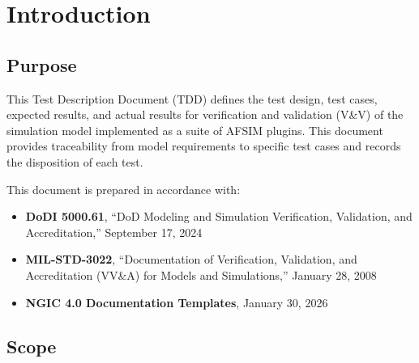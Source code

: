 \vfill
\pagebreak


\tableofcontents\thispagestyle{fancy}\pagebreak
\listoftables\thispagestyle{fancy}\pagebreak
\listoffigures\thispagestyle{fancy}\pagebreak



\section{\unclass Introduction}\label{sec:Introduction}

\subsection{\unclass Purpose}\label{sec:Purpose}

\unclass This Test Description Document (TDD) defines the test design, test cases, expected results, and actual results for verification and validation (V\&V) of the \modelname{} simulation model implemented as a suite of AFSIM plugins. This document provides traceability from model requirements to specific test cases and records the disposition of each test.

\unclass This document is prepared in accordance with:

\begin{itemize}
	\item \unclass \textbf{DoDI 5000.61}, ``DoD Modeling and Simulation Verification, Validation, and Accreditation,'' September 17, 2024~\cite{DoDI500061}
	\item \unclass \textbf{MIL-STD-3022}, ``Documentation of Verification, Validation, and Accreditation (VV\&A) for Models and Simulations,'' January 28, 2008~\cite{MILSTD3022}
	\item \unclass \textbf{NGIC 4.0 Documentation Templates}, January 30, 2026
\end{itemize}

\subsection{\unclass Scope}\label{sec:Scope}


